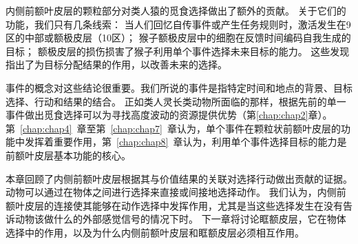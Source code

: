 内侧前额叶皮层的颗粒部分对类人猿的觅食选择做出了额外的贡献。
关于它们的功能，我们只有几条线索：
当人们回忆自传事件或产生任务规则时，激活发生在9区的中部或额极皮层（10区）；
猴子额极皮层中的细胞在反馈时间编码自我生成的目标；
额极皮层的损伤损害了猴子利用单个事件选择未来目标的能力。
这些发现指出了为目标分配结果的作用，以改善未来的选择\cite{tsujimoto2011frontal}。\par
事件的概念对这些结论很重要。我们所说的事件是指特定时间和地点的背景、目标选择、行动和结果的结合。
正如类人灵长类动物所面临的那样，根据先前的单一事件做出觅食选择可以为寻找高度波动的资源提供优势（第\ref{chap:chap2}章）。
第~\ref{chap:chap4}~章至第~\ref{chap:chap7}~章认为，单个事件在颗粒状前额叶皮层的功能中发挥着重要作用，第~\ref{chap:chap8}~章认为，利用单个事件选择目标的能力是前额叶皮层基本功能的核心。\par
本章回顾了内侧前额叶皮层根据其与价值结果的关联对选择行动做出贡献的证据。
动物可以通过在物体之间进行选择来直接或间接地选择动作。
我们认为，内侧前额叶皮层的连接使其能够在动作选择中发挥作用，尤其是当这些选择发生在没有告诉动物该做什么的外部感觉信号的情况下时。
下一章将讨论眶额皮层，它在物体选择中的作用，以及为什么内侧前额叶皮层和眶额皮层必须相互作用。\par



